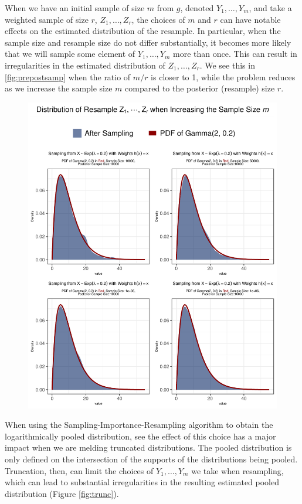 \documentclass[12pt,twoside]{smiththesis}
\begin{document}
When we have an initial sample of size \(m\) from \(g\), denoted \(Y_1,\dots,Y_m\), and take a weighted sample of size \(r\), \(Z_1,\dots,Z_r\), the choices of \(m\) and \(r\) can have notable effects on the estimated distribution of the resample. In particular, when the sample size and resample size do not differ substantially, it becomes more likely that we will sample some element of \(Y_1,\dots,Y_m\) more than once. This can result in irregularities in the estimated distribution of \(Z_1,\dots,Z_r\). We see this in \ref{fig:prepostsamp} when the ratio of \(m/r\) is closer to 1, while the problem reduces as we increase the sample size \(m\) compared to the posterior (resample) size \(r\).
\begin{figure}

{\centering \includegraphics[width=1\linewidth]{thesis_files/figure-latex/pre-post-sampling-code-1} 

}

\caption{\label{fig:prepostsamp}}\label{fig:pre-post-sampling-code}
\end{figure}
When using the Sampling-Importance-Resampling algorithm to obtain the logarithmically pooled distribution, see the effect of this choice has a major impact when we are melding truncated distributions. The pooled distribution is only defined on the intersection of the supports of the distributions being pooled. Truncation, then, can limit the choices of \(Y_1,\dots, Y_m\) we take when resampling, which can lead to substantial irregularities in the resulting estimated pooled distribution (Figure \ref{fig:trunc}).
\end{document}
